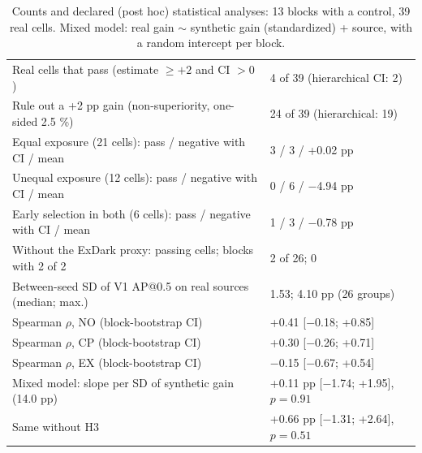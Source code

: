 \begin{table}[H]\centering\scriptsize
\caption{Counts and declared (post hoc) statistical analyses: 13 blocks with a control, 39 real cells. Mixed model: real gain $\sim$ synthetic gain (standardized) + source, with a random intercept per block.}\label{tab:s-estad}
\begin{tabular}{@{}p{5.0cm} p{2.9cm}@{}}\toprule
Real cells that pass (estimate $\geq+2$ and CI $>0$) & 4 of 39 (hierarchical CI: 2) \\
Rule out a +2 pp gain (non-superiority, one-sided 2.5 \%) & 24 of 39 (hierarchical: 19) \\
Equal exposure (21 cells): pass / negative with CI / mean & 3 / 3 / +0.02 pp \\
Unequal exposure (12 cells): pass / negative with CI / mean & 0 / 6 / $-$4.94 pp \\
Early selection in both (6 cells): pass / negative with CI / mean & 1 / 3 / $-$0.78 pp \\
Without the ExDark proxy: passing cells; blocks with 2 of 2 & 2 of 26; 0 \\
Between-seed SD of V1 AP@0.5 on real sources (median; max.) & 1.53; 4.10 pp (26 groups) \\
Spearman $\rho$, NO (block-bootstrap CI) & +0.41 [$-$0.18; +0.85] \\
Spearman $\rho$, CP (block-bootstrap CI) & +0.30 [$-$0.26; +0.71] \\
Spearman $\rho$, EX (block-bootstrap CI) & $-$0.15 [$-$0.67; +0.54] \\
Mixed model: slope per SD of synthetic gain (14.0 pp) & +0.11 pp [$-$1.74; +1.95], $p=0.91$ \\
Same without H3 & +0.66 pp [$-$1.31; +2.64], $p=0.51$ \\
\bottomrule\end{tabular}\end{table}
